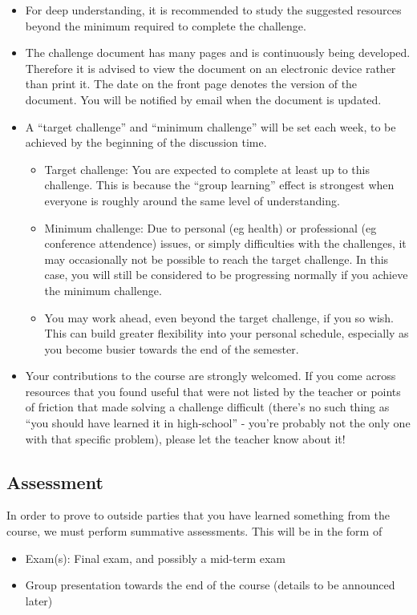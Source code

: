 \begin{itemize}
    \item For deep understanding, it is recommended to study the suggested resources beyond the minimum required to complete the challenge.
    \item The challenge document has many pages and is continuously being developed. Therefore it is advised to view the document on an electronic device rather than print it. The date on the front page denotes the version of the document. You will be notified by email when the document is updated.
    \item A “target challenge” and “minimum challenge” will be set each week, to be achieved by the beginning of the discussion time.
    \begin{itemize}
        \item Target challenge: You are expected to complete at least up to this challenge. This is because the “group learning” effect is strongest when everyone is roughly around the same level of understanding.
        \item Minimum challenge: Due to personal (eg health) or professional (eg conference attendence) issues, or simply difficulties with the challenges, it may occasionally not be possible to reach the target challenge. In this case, you will still be considered to be progressing normally if you achieve the minimum challenge.
        \item You may work ahead, even beyond the target challenge, if you so wish. This can build greater flexibility into your personal schedule, especially as you become busier towards the end of the semester.
    \end{itemize}
    \item Your contributions to the course are strongly welcomed. If you come across resources that you found useful that were not listed by the teacher or points of friction that made solving a challenge difficult (there's no such thing as ``you should have learned it in high-school'' - you're probably not the only one with that specific problem), please let the teacher know about it!
\end{itemize}

\subsection{Assessment}
In order to prove to outside parties that you have learned something from the course, we must perform summative assessments. This will be in the form of
\begin{itemize}
    \item Exam(s): Final exam, and possibly a mid-term exam
    \item Group presentation towards the end of the course (details to be announced later)
\end{itemize}


